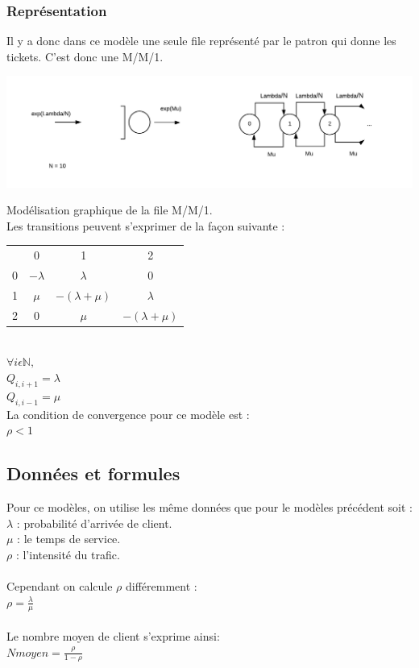 \documentclass[a4paper,11pt]{article}
\begin{document}
	\subsubsection{Représentation}
		Il y a donc dans ce modèle une seule file représenté par le patron qui donne les tickets. C'est donc une M/M/1.\\
	\centerline{\includegraphics[scale=0.5]{MM1.png}}
	Modélisation graphique de la file M/M/1.\\
	Les transitions peuvent s'exprimer de la façon suivante :\\
		\begin{tabular}{ | c | c | c | c |}
		\hline
		\ & 0          & 1                 & 2\\			
		0 & $-\lambda$ & $\lambda$         & 0\\
		1 & $\mu$      & $-(\lambda + \mu)$& $\lambda$\\
		2 & 0          & $\mu$             &  $-(\lambda + \mu)$\\
		\hline  
		\end{tabular}\\
		$\forall i \epsilon \pmb{\mathbb{N}},$\\
		$Q_{i, i+1} = \lambda$\\
		$Q_{i, i-1} = \mu$\\
		La condition de convergence pour ce modèle est :\\
		$\rho < 1$
	\subsection{Données et formules}
	Pour ce modèles, on utilise les même données que pour le modèles précédent soit :\\
	$\lambda$ : probabilité d'arrivée de client.\\
	$\mu$ : le temps de service.\\
	$\rho$ : l'intensité du trafic.\\
	\\
	Cependant on calcule $\rho$ différemment :\\
	$\rho = \frac{\lambda}{\mu}$\\
	\\
	Le nombre moyen de client s'exprime ainsi:\\
	$Nmoyen = \frac{\rho}{1-\rho}$
\end{document}

